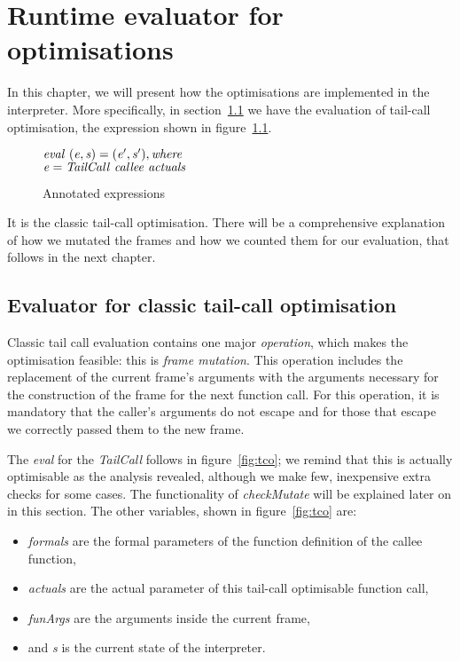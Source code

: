 \documentclass[diploma]{softlab-thesis}
\begin{document}
\chapter {Runtime evaluator for optimisations}
\label{ch:evaluator}

In this chapter, we will present how the optimisations are implemented in the interpreter.
More specifically,
in section~\ref{sec:classic-tco-eval} we have the evaluation of tail-call optimisation, the expression 
shown in figure~\ref{fig:annos}.
\begin{figure}[h]
$\mathit{eval \hfill\ (e, s) = (e', s'), where}$ \\
$\mathit{e = TailCall \hfill\ callee \hfill\ actuals}$ \\
\caption{Annotated expressions\label{fig:annos}}
\end{figure}

It is the classic tail-call optimisation. There will be a comprehensive explanation of how 
we mutated the frames and how we counted them for 
our evaluation, that follows in the next chapter.

\section {Evaluator for classic tail-call optimisation}
\label{sec:classic-tco-eval}

Classic tail call evaluation contains one major \textit{operation}, which makes the optimisation 
feasible: this is \textit{frame mutation}. This operation includes the replacement of the current 
frame's arguments with the arguments necessary for the construction of the frame for the next 
function call. For this operation, it is mandatory that the caller's arguments do not escape and 
for those that escape we correctly passed them to the new frame. 

The \textit{eval} for the \textit{TailCall} follows in figure~\ref{fig:tco}; we remind that this is actually optimisable as the analysis 
revealed, although we make few, inexpensive extra checks for some cases.
The functionality of \textit{checkMutate} will be explained later on in this section. 
The other variables, shown in figure~\ref{fig:tco} are:
\begin{itemize}
  \item \textit{formals} are the formal parameters of the function definition of the callee function,
  \item \textit{actuals} are the actual parameter of this tail-call optimisable function call,
  \item \textit{funArgs} are the arguments inside the current frame, 
  \item and \textit{s} is the current state of the interpreter.
\end{itemize}
\end{document}
